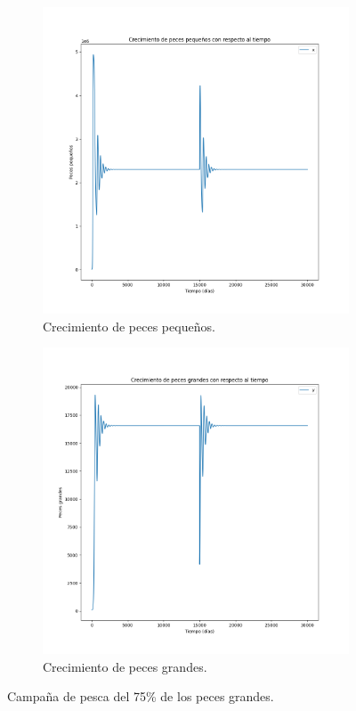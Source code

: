 \documentclass[11pt,a4paper]{report}
\begin{document}
\begin{figure}[H]
  \begin{subfigure}[b]{0.49\textwidth}
    \includegraphics[width=\textwidth, height=\textwidth]{img/Cap-3/apartado-2/pequenyos_pesca_75.png}
    \caption{Crecimiento de peces pequeños.}
    \label{fig:f1}
  \end{subfigure}
  \hfill
  \begin{subfigure}[b]{0.49\textwidth}
    \includegraphics[width=\textwidth, height=\textwidth]{img/Cap-3/apartado-2/grandes_pesca_75.png}
    \caption{Crecimiento de peces grandes.}
    \label{fig:f2}
  \end{subfigure}
  \caption{Campaña de pesca del 75\% de los peces grandes.}
\end{figure}
\end{document}

